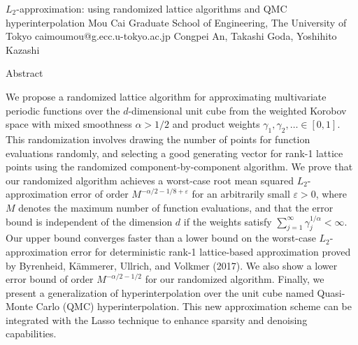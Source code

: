 \begin{talk}
  {$L_2$-approximation: using randomized lattice algorithms and QMC hyperinterpolation}%
  {Mou Cai}%
  {Graduate School of Engineering, The University of Tokyo}%
  {caimoumou@g.ecc.u-tokyo.ac.jp}%
  {Congpei An, Takashi Goda, Yoshihito Kazashi}%
  
    
Abstract

   
We propose a randomized lattice algorithm for approximating multivariate periodic functions over the $d$-dimensional unit cube from the weighted Korobov space with mixed smoothness $\alpha > 1/2$ and product weights $\gamma_1,\gamma_2,\ldots\in [0,1]$. This randomization involves drawing the number of points for function evaluations randomly, and selecting a good generating vector for rank-1 lattice points using the randomized component-by-component algorithm. We prove that our randomized algorithm achieves a worst-case root mean squared $L_2$-approximation error of order $M^{-\alpha/2 - 1/8 + \varepsilon}$ for an arbitrarily small $\varepsilon > 0$, where $M$ denotes the maximum number of function evaluations, and that the error bound is independent of the dimension $d$ if the weights satisfy $\sum_{j=1}^\infty \gamma_j^{1/\alpha} < \infty$. Our upper bound converges faster than a lower bound on the worst-case $L_2$-approximation error for deterministic rank-1 lattice-based approximation proved by Byrenheid, K\"{a}mmerer, Ullrich, and Volkmer (2017). We also show a lower error bound of order $M^{-\alpha/2-1/2}$ for our randomized algorithm. Finally, we present a generalization of hyperinterpolation over the unit cube named Quasi-Monte Carlo (QMC) hyperinterpolation. This new approximation scheme can be integrated with the Lasso technique to enhance sparsity and denoising capabilities.

\medskip


\end{talk}

